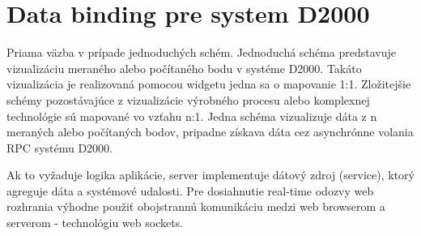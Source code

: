 \section{Data binding pre system D2000}
Priama väzba v prípade jednoduchých schém. Jednoduchá schéma predstavuje vizualizáciu meraného alebo počítaného bodu v systéme D2000. Takáto vizualizácia je realizovaná pomocou widgetu jedna sa o mapovanie 1:1.
Zložitejšie schémy pozostávajúce z vizualizácie výrobného procesu alebo komplexnej technológie sú mapované vo vzťahu n:1. Jedna schéma vizualizuje dáta z n meraných alebo počítaných bodov, pripadne získava dáta cez asynchrónne volania \ac{RPC} systému D2000.

Ak to vyžaduje logika aplikácie, server implementuje dátový zdroj (service), ktorý agreguje dáta a systémové udalosti. Pre dosiahnutie real-time odozvy web rozhrania výhodne použiť obojstrannú komunikáciu medzi web browserom a serverom - technológiu web sockets.

